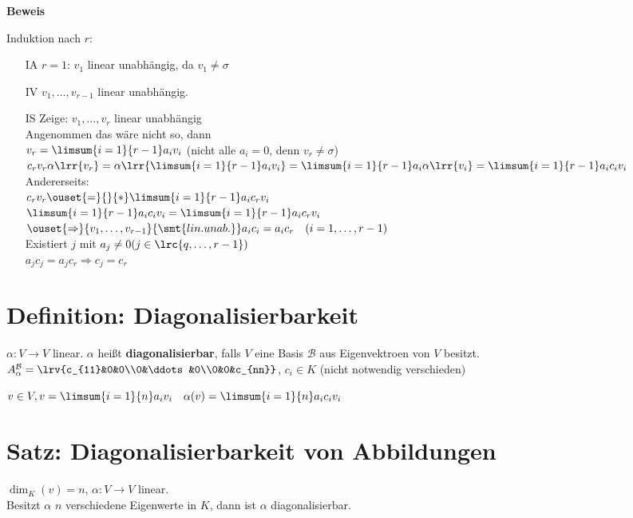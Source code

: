 	\textbf{Beweis}

	Induktion nach $r$:
	\begin{itemize}
		\item[IA] $r=1$: $v_1$ linear unabhängig, da $v_1\neq\sigma$
		\item[IV] $v_1,\dots,v_{r-1}$ linear unabhängig.
		\item[IS] Zeige: $v_1,\dots,v_r$ linear unabhängig\\
			Angenommen das wäre nicht so, dann\\
			$v_r=\limsum{i=1}{r-1}a_iv_i$ (nicht alle $a_i=0$, denn $v_r\neq\sigma$)\\
			$c_rv_r\alpha\lrr{v_r}=\alpha\lrr{\limsum{i=1}{r-1}a_iv_i}=\limsum{i=1}{r-1}a_i\alpha\lrr{v_i}=\limsum{i=1}{r-1}a_ic_iv_i$\\
			Andererseits:\\
			$c_rv_r\ouset{=}{}{*}\limsum{i=1}{r-1}a_ic_rv_i$\\
			$\limsum{i=1}{r-1}a_ic_iv_i=\limsum{i=1}{r-1}a_ic_rv_i$\\
			$\ouset{\Rightarrow}{v_1,\dots,v_{r-1}}{\smt{lin. unab.}}a_ic_i=a_ic_r\quad (i=1,\dots,r-1)$\\
			Existiert $j$ mit $a_j\neq 0 (j\in\lrc{q,\dots,r-1})$\\
			$a_jc_j=a_jc_r\Rightarrow c_j=c_r$\lightning
	\end{itemize}

\section{Definition: Diagonalisierbarkeit}
	$\alpha:V\rightarrow V$ linear. $\alpha$ heißt \textbf{diagonalisierbar}, falls $V$ eine Basis $\mathcal{B}$ aus Eigenvektroen von $V$ besitzt.\\
	$A_\alpha^\mathcal{B}=\lrv{c_{11}&0&0\\0&\ddots&0\\0&0&c_{nn}}$, $c_i\in K$ (nicht notwendig verschieden)

	$v\in V, v=\limsum{i=1}{n}a_iv_i\quad \alpha(v)=\limsum{i=1}{n}a_ic_iv_i$

\section{Satz: Diagonalisierbarkeit von Abbildungen}
	$\dim_K(v)=n$, $\alpha:V\rightarrow V$ linear.\\
	Besitzt $\alpha$ $n$ verschiedene Eigenwerte in $K$, dann ist $\alpha$ diagonalisierbar.

